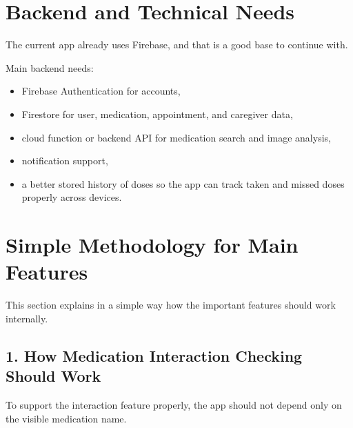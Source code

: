 \documentclass[11pt,a4paper]{article}
\begin{document}
\section{Backend and Technical Needs}
The current app already uses Firebase, and that is a good base to continue with.

Main backend needs:
\begin{itemize}
    \item Firebase Authentication for accounts,
    \item Firestore for user, medication, appointment, and caregiver data,
    \item cloud function or backend API for medication search and image analysis,
    \item notification support,
    \item a better stored history of doses so the app can track taken and missed doses properly across devices.
\end{itemize}

\section{Simple Methodology for Main Features}
This section explains in a simple way how the important features should work internally.

\subsection{1. How Medication Interaction Checking Should Work}
To support the interaction feature properly, the app should not depend only on the visible medication name.
\end{document}
